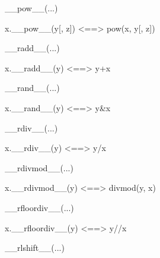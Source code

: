 \documentclass[letterpaper,10pt,english]{sphinxmanual}
\begin{document}
\begin{description}
\begin{description}
\begin{DUlineblock}{0em}
\begin{DUlineblock}{\DUlineblockindent}
\item[] 
\end{DUlineblock}
\item[] \_\_pow\_\_(...)
\item[]
\begin{DUlineblock}{\DUlineblockindent}
\item[] x.\_\_pow\_\_(y{[}, z{]}) \textless{}==\textgreater{} pow(x, y{[}, z{]})
\item[] 
\end{DUlineblock}
\item[] \_\_radd\_\_(...)
\item[]
\begin{DUlineblock}{\DUlineblockindent}
\item[] x.\_\_radd\_\_(y) \textless{}==\textgreater{} y+x
\item[] 
\end{DUlineblock}
\item[] \_\_rand\_\_(...)
\item[]
\begin{DUlineblock}{\DUlineblockindent}
\item[] x.\_\_rand\_\_(y) \textless{}==\textgreater{} y\&x
\item[] 
\end{DUlineblock}
\item[] \_\_rdiv\_\_(...)
\item[]
\begin{DUlineblock}{\DUlineblockindent}
\item[] x.\_\_rdiv\_\_(y) \textless{}==\textgreater{} y/x
\item[] 
\end{DUlineblock}
\item[] \_\_rdivmod\_\_(...)
\item[]
\begin{DUlineblock}{\DUlineblockindent}
\item[] x.\_\_rdivmod\_\_(y) \textless{}==\textgreater{} divmod(y, x)
\item[] 
\end{DUlineblock}
\item[] \_\_rfloordiv\_\_(...)
\item[]
\begin{DUlineblock}{\DUlineblockindent}
\item[] x.\_\_rfloordiv\_\_(y) \textless{}==\textgreater{} y//x
\item[] 
\end{DUlineblock}
\item[] \_\_rlshift\_\_(...)

\end{DUlineblock}
\end{description}
\end{description}
\end{document}
